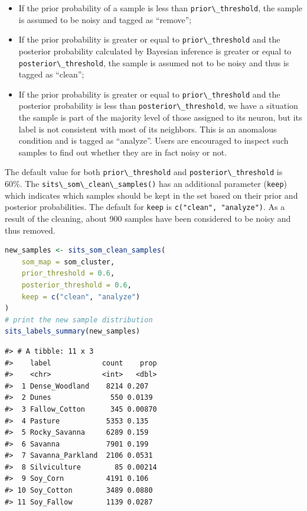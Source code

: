 \documentclass[
  11pt,
]{report}
\newcommand{\passthrough}[1]{#1}
\providecommand{\tightlist}{%
  \setlength{\itemsep}{0pt}\setlength{\parskip}{0pt}}
\begin{document}
\begin{itemize}
\tightlist
\item
  If the prior probability of a sample is less than
  \passthrough{\lstinline!prior\_threshold!}, the sample is assumed to
  be noisy and tagged as ``remove'';
\item
  If the prior probability is greater or equal to
  \passthrough{\lstinline!prior\_threshold!} and the posterior
  probability calculated by Bayesian inference is greater or equal to
  \passthrough{\lstinline!posterior\_threshold!}, the sample is assumed
  not to be noisy and thus is tagged as ``clean'';
\item
  If the prior probability is greater or equal to
  \passthrough{\lstinline!prior\_threshold!} and the posterior
  probability is less than
  \passthrough{\lstinline!posterior\_threshold!}, we have a situation
  the sample is part of the majority level of those assigned to its
  neuron, but its label is not consistent with most of its neighbors.
  This is an anomalous condition and is tagged as ``analyze''. Users are
  encouraged to inspect such samples to find out whether they are in
  fact noisy or not.
\end{itemize}

The default value for both \passthrough{\lstinline!prior\_threshold!}
and \passthrough{\lstinline!posterior\_threshold!} is 60\%. The
\passthrough{\lstinline!sits\_som\_clean\_samples()!} has an additional
parameter (\passthrough{\lstinline!keep!}) which indicates which samples
should be kept in the set based on their prior and posterior
probabilities. The default for \passthrough{\lstinline!keep!} is
\passthrough{\lstinline!c("clean", "analyze")!}. As a result of the
cleaning, about 900 samples have been considered to be noisy and thus
removed.

\begin{lstlisting}[language=R]
new_samples <- sits_som_clean_samples(
    som_map = som_cluster, 
    prior_threshold = 0.6,
    posterior_threshold = 0.6,
    keep = c("clean", "analyze")
)
# print the new sample distribution
sits_labels_summary(new_samples)
\end{lstlisting}

\begin{lstlisting}
#> # A tibble: 11 x 3
#>    label            count    prop
#>    <chr>            <int>   <dbl>
#>  1 Dense_Woodland    8214 0.207  
#>  2 Dunes              550 0.0139 
#>  3 Fallow_Cotton      345 0.00870
#>  4 Pasture           5353 0.135  
#>  5 Rocky_Savanna     6289 0.159  
#>  6 Savanna           7901 0.199  
#>  7 Savanna_Parkland  2106 0.0531 
#>  8 Silviculture        85 0.00214
#>  9 Soy_Corn          4191 0.106  
#> 10 Soy_Cotton        3489 0.0880 
#> 11 Soy_Fallow        1139 0.0287
\end{lstlisting}
\end{document}
